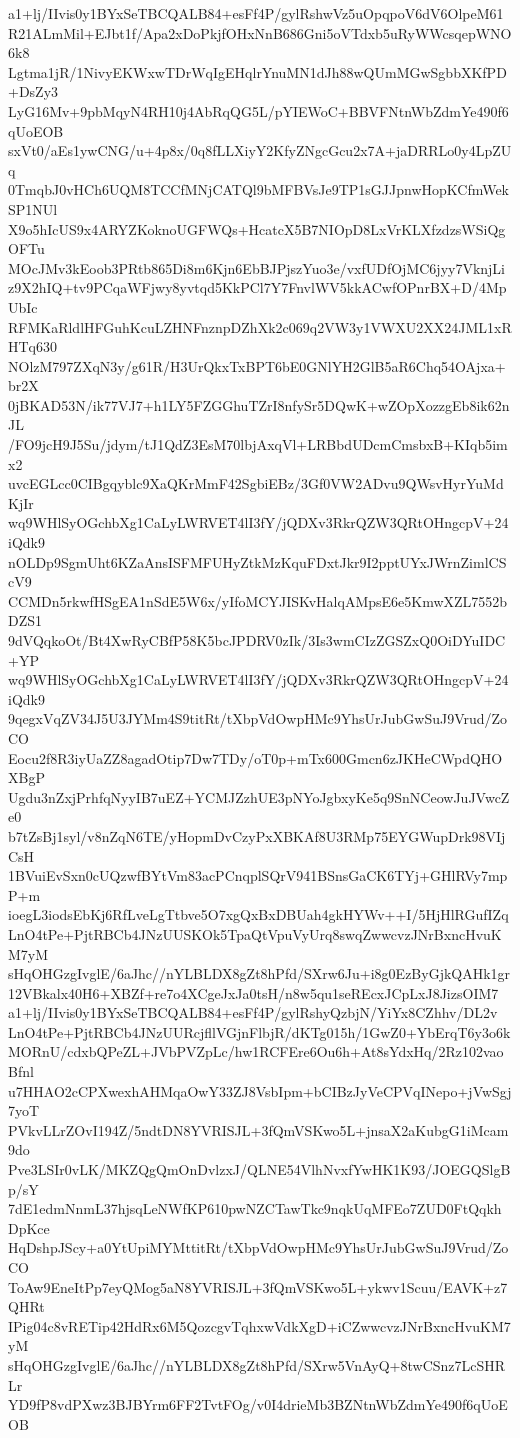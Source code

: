 a1+lj/IIvis0y1BYxSeTBCQALB84+esFf4P/gylRshwVz5uOpqpoV6dV6OlpeM61
R21ALmMil+EJbt1f/Apa2xDoPkjfOHxNnB686Gni5oVTdxb5uRyWWcsqepWNO6k8
Lgtma1jR/1NivyEKWxwTDrWqIgEHqlrYnuMN1dJh88wQUmMGwSgbbXKfPD+DsZy3
LyG16Mv+9pbMqyN4RH10j4AbRqQG5L/pYIEWoC+BBVFNtnWbZdmYe490f6qUoEOB
sxVt0/aEs1ywCNG/u+4p8x/0q8fLLXiyY2KfyZNgcGcu2x7A+jaDRRLo0y4LpZUq
0TmqbJ0vHCh6UQM8TCCfMNjCATQl9bMFBVsJe9TP1sGJJpnwHopKCfmWekSP1NUl
X9o5hIcUS9x4ARYZKoknoUGFWQs+HcatcX5B7NIOpD8LxVrKLXfzdzsWSiQgOFTu
MOcJMv3kEoob3PRtb865Di8m6Kjn6EbBJPjszYuo3e/vxfUDfOjMC6jyy7VknjLi
z9X2hIQ+tv9PCqaWFjwy8yvtqd5KkPCl7Y7FnvlWV5kkACwfOPnrBX+D/4MpUbIc
RFMKaRldlHFGuhKcuLZHNFnznpDZhXk2c069q2VW3y1VWXU2XX24JML1xRHTq630
NOlzM797ZXqN3y/g61R/H3UrQkxTxBPT6bE0GNlYH2GlB5aR6Chq54OAjxa+br2X
0jBKAD53N/ik77VJ7+h1LY5FZGGhuTZrI8nfySr5DQwK+wZOpXozzgEb8ik62nJL
/FO9jcH9J5Su/jdym/tJ1QdZ3EsM70lbjAxqVl+LRBbdUDcmCmsbxB+KIqb5imx2
uvcEGLcc0CIBgqyblc9XaQKrMmF42SgbiEBz/3Gf0VW2ADvu9QWsvHyrYuMdKjIr
wq9WHlSyOGchbXg1CaLyLWRVET4lI3fY/jQDXv3RkrQZW3QRtOHngcpV+24iQdk9
nOLDp9SgmUht6KZaAnsISFMFUHyZtkMzKquFDxtJkr9I2pptUYxJWrnZimlCScV9
CCMDn5rkwfHSgEA1nSdE5W6x/yIfoMCYJISKvHalqAMpsE6e5KmwXZL7552bDZS1
9dVQqkoOt/Bt4XwRyCBfP58K5bcJPDRV0zIk/3Is3wmCIzZGSZxQ0OiDYuIDC+YP
wq9WHlSyOGchbXg1CaLyLWRVET4lI3fY/jQDXv3RkrQZW3QRtOHngcpV+24iQdk9
9qegxVqZV34J5U3JYMm4S9titRt/tXbpVdOwpHMc9YhsUrJubGwSuJ9Vrud/ZoCO
Eocu2f8R3iyUaZZ8agadOtip7Dw7TDy/oT0p+mTx600Gmcn6zJKHeCWpdQHOXBgP
Ugdu3nZxjPrhfqNyyIB7uEZ+YCMJZzhUE3pNYoJgbxyKe5q9SnNCeowJuJVwcZe0
b7tZsBj1syl/v8nZqN6TE/yHopmDvCzyPxXBKAf8U3RMp75EYGWupDrk98VIjCsH
1BVuiEvSxn0cUQzwfBYtVm83acPCnqplSQrV941BSnsGaCK6TYj+GHlRVy7mpP+m
ioegL3iodsEbKj6RfLveLgTtbve5O7xgQxBxDBUah4gkHYWv++I/5HjHlRGufIZq
LnO4tPe+PjtRBCb4JNzUUSKOk5TpaQtVpuVyUrq8swqZwwcvzJNrBxncHvuKM7yM
sHqOHGzgIvglE/6aJhc//nYLBLDX8gZt8hPfd/SXrw6Ju+i8g0EzByGjkQAHk1gr
12VBkalx40H6+XBZf+re7o4XCgeJxJa0tsH/n8w5qu1seREcxJCpLxJ8JizsOIM7
a1+lj/IIvis0y1BYxSeTBCQALB84+esFf4P/gylRshyQzbjN/YiYx8CZhhv/DL2v
LnO4tPe+PjtRBCb4JNzUURcjfllVGjnFlbjR/dKTg015h/1GwZ0+YbErqT6y3o6k
MORnU/cdxbQPeZL+JVbPVZpLc/hw1RCFEre6Ou6h+At8sYdxHq/2Rz102vaoBfnl
u7HHAO2cCPXwexhAHMqaOwY33ZJ8VsbIpm+bCIBzJyVeCPVqINepo+jVwSgj7yoT
PVkvLLrZOvI194Z/5ndtDN8YVRISJL+3fQmVSKwo5L+jnsaX2aKubgG1iMcam9do
Pve3LSIr0vLK/MKZQgQmOnDvlzxJ/QLNE54VlhNvxfYwHK1K93/JOEGQSlgBp/sY
7dE1edmNnmL37hjsqLeNWfKP610pwNZCTawTkc9nqkUqMFEo7ZUD0FtQqkhDpKce
HqDshpJScy+a0YtUpiMYMttitRt/tXbpVdOwpHMc9YhsUrJubGwSuJ9Vrud/ZoCO
ToAw9EneItPp7eyQMog5aN8YVRISJL+3fQmVSKwo5L+ykwv1Scuu/EAVK+z7QHRt
IPig04c8vRETip42HdRx6M5QozcgvTqhxwVdkXgD+iCZwwcvzJNrBxncHvuKM7yM
sHqOHGzgIvglE/6aJhc//nYLBLDX8gZt8hPfd/SXrw5VnAyQ+8twCSnz7LcSHRLr
YD9fP8vdPXwz3BJBYrm6FF2TvtFOg/v0I4drieMb3BZNtnWbZdmYe490f6qUoEOB

